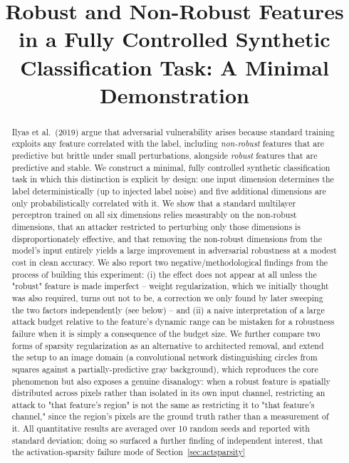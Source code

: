 \documentclass[11pt]{article}
\title{Robust and Non-Robust Features in a Fully Controlled Synthetic
Classification Task: A Minimal Demonstration}
\author{}
\date{}
\begin{document}
\maketitle

\begin{abstract}
Ilyas et al.\ (2019) argue that adversarial vulnerability arises because
standard training exploits any feature correlated with the label, including
\emph{non-robust} features that are predictive but brittle under small
perturbations, alongside \emph{robust} features that are predictive and
stable. We construct a minimal, fully controlled synthetic classification
task in which this distinction is explicit by design: one input dimension
determines the label deterministically (up to injected label noise) and five
additional dimensions are only probabilistically correlated with it. We show
that a standard multilayer perceptron trained on all six dimensions relies
measurably on the non-robust dimensions, that an attacker restricted to
perturbing only those dimensions is disproportionately effective, and that
removing the non-robust dimensions from the model's input entirely yields a
large improvement in adversarial robustness at a modest cost in clean
accuracy. We also report two negative/methodological findings from the
process of building this experiment: (i) the effect does not appear at all
unless the "robust" feature is made imperfect -- weight regularization,
which we initially thought was also required, turns out not to be, a
correction we only found by later sweeping the two factors independently
(see below) -- and (ii) a naive interpretation of a large attack budget
relative to the feature's dynamic range can be mistaken for a robustness
failure when it is simply a consequence of the budget size. We further
compare two forms of sparsity regularization as an alternative to
architected removal, and extend the setup to an image domain (a
convolutional network distinguishing circles from squares against a
partially-predictive gray background), which reproduces the core
phenomenon but also exposes a genuine disanalogy: when a robust feature is
spatially distributed across pixels rather than isolated in its own input
channel, restricting an attack to "that feature's region" is not the same
as restricting it to "that feature's channel," since the region's pixels
are the ground truth rather than a measurement of it. All quantitative
results are averaged over 10 random seeds and reported with standard
deviation; doing so surfaced a further finding of independent interest,
that the activation-sparsity failure mode of Section~\ref{sec:actsparsity}

\end{abstract}
\end{document}
